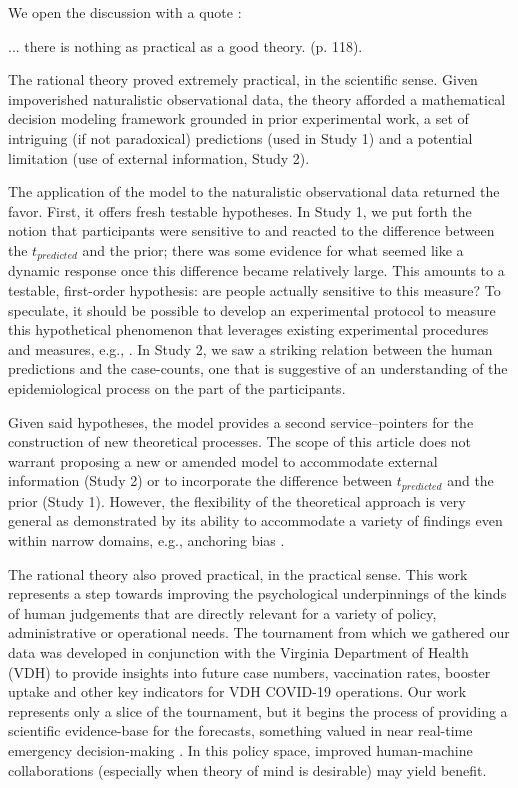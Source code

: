 \noindent
We open the discussion with a quote \citep{Lewin1943}:
\begin{displayquote}
... there is nothing as practical as a good theory. (p. 118).
\end{displayquote}
The rational theory proved extremely practical, in the scientific sense.  Given impoverished naturalistic observational data, the theory afforded a mathematical decision modeling framework grounded in prior experimental work\citep{GriffithsTenenbaum2006,GriffithsTenenbaum2011}, a set of intriguing (if not paradoxical) predictions (used in Study 1) and a potential limitation (use of external information, Study 2).  

The application of the model to the naturalistic observational data returned the favor. First, it offers fresh testable hypotheses.  In Study 1, we put forth the notion that participants were sensitive to and reacted to the difference between the $t_{predicted}$ and the prior; there was some evidence for what seemed like a dynamic response once this difference became relatively large.  This amounts to a testable, first-order hypothesis: are people actually sensitive to this measure?  To speculate, it should be possible to develop an experimental protocol to measure this hypothetical phenomenon that leverages existing experimental procedures and measures, e.g., \citep{sussman2007role}.  In Study 2, we saw a striking relation between the human predictions and the case-counts, one that is suggestive of an understanding of the epidemiological process on the part of the participants. 

Given said hypotheses, the model provides a second service--pointers for the construction of new theoretical processes.  The scope of this article does not warrant proposing a new or amended model to accommodate external information (Study 2) or to incorporate the difference between $t_{predicted}$ and the prior (Study 1).  However, the flexibility of the theoretical approach is very general as demonstrated by its ability to accommodate a variety of findings even within narrow domains, e.g., anchoring bias \citep{Lieder2018}. 

The rational theory also proved practical, in the practical sense.  This work represents a step towards improving the psychological underpinnings of the kinds of human judgements that are directly relevant for a variety of policy, administrative or operational needs\citep{Galesic2021}.  The tournament from which we gathered our data was developed in conjunction with the Virginia Department of Health (VDH) to provide insights into future case numbers, vaccination rates, booster uptake and other key indicators for VDH COVID-19 operations.  Our work represents only a slice of the tournament, but it begins the process of providing a scientific evidence-base for the forecasts, something valued in near real-time emergency decision-making \citep{Galea2021}.  In this policy space, improved human-machine collaborations (especially when theory of mind is desirable) may yield benefit.  

